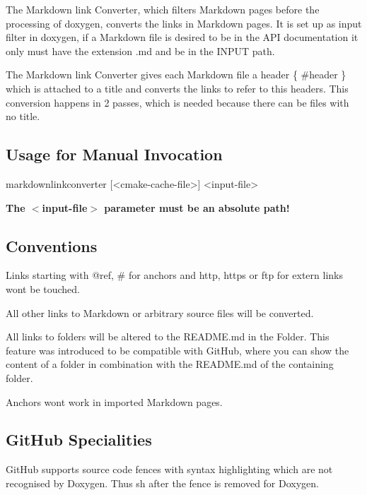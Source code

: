 The Markdown link Converter, which filters Markdown pages before the processing of doxygen, converts the links in Markdown pages. It is set up as input filter in doxygen, if a Markdown file is desired to be in the A\+PI documentation it only must have the extension {\ttfamily .md} and be in the {\ttfamily I\+N\+P\+UT} path.

The Markdown link Converter gives each Markdown file a header {\ttfamily \{ \#header \}} which is attached to a title and converts the links to refer to this headers. This conversion happens in 2 passes, which is needed because there can be files with no title.

\subsection*{Usage for Manual Invocation}

\begin{DoxyVerb}    markdownlinkconverter [<cmake-cache-file>] <input-file>
\end{DoxyVerb}


{\bfseries The $<$input-\/file$>$ parameter must be an absolute path!}

\subsection*{Conventions}


\begin{DoxyItemize}
\item Links starting with {\ttfamily @ref}, {\ttfamily \#} for anchors and {\ttfamily http}, {\ttfamily https} or {\ttfamily ftp} for extern links wont be touched.
\item All other links to Markdown or arbitrary source files will be converted.
\item All links to folders will be altered to the R\+E\+A\+D\+M\+E.\+md in the Folder. This feature was introduced to be compatible with Git\+Hub, where you can show the content of a folder in combination with the R\+E\+A\+D\+M\+E.\+md of the containing folder.
\item Anchors wont work in imported Markdown pages.
\end{DoxyItemize}

\subsection*{Git\+Hub Specialities}


\begin{DoxyItemize}
\item Git\+Hub supports source code fences with syntax highlighting which are not recognised by Doxygen. Thus {\ttfamily sh} after the fence is removed for Doxygen.
\end{DoxyItemize}

